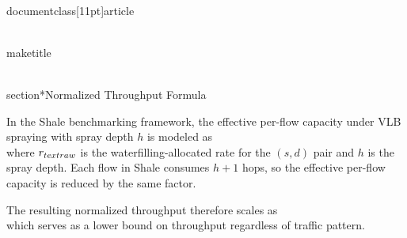 \\documentclass[11pt]{article}
\begin{document}
\\maketitle

\\section*{Normalized Throughput Formula}

In the Shale benchmarking framework, the effective per-flow capacity under VLB spraying with spray depth $h$ is modeled as
\\[
    r_{\\text{eff}}(s, d) = \\frac{r_{\\text{raw}}(s, d)}{h + 1},
\\]
where $r_{\\text{raw}}$ is the waterfilling-allocated rate for the $(s, d)$ pair and $h$ is the spray depth. Each flow in Shale consumes $h+1$ hops, so the effective per-flow capacity is reduced by the same factor.

The resulting normalized throughput therefore scales as
\\[
    \\Theta \\approx \\frac{1}{h+1},
\\]
which serves as a lower bound on throughput regardless of traffic pattern.

\
\end{document}
